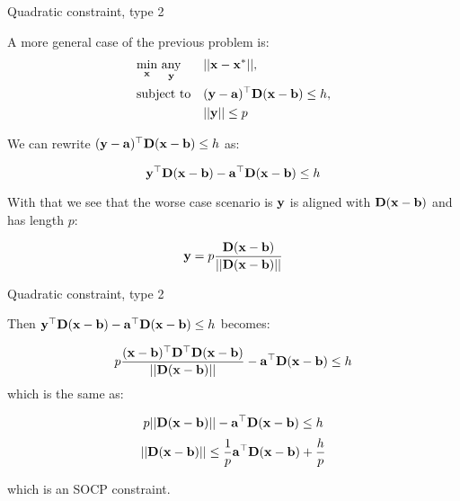 \documentclass{beamer}
\begin{document}
\begin{frame}{Quadratic constraint, type 2}
\begin{flushleft}

A more general case of the previous problem is:
%
\begin{equation}
\begin{aligned}
& \underset{\mathbf{x}}{\text{min}} \ \underset{\mathbf{y}}{\text{any}}
& & ||\mathbf{x} - \mathbf{x}^*||, \\
& \text{subject to}
& & (\mathbf{y} - \mathbf{a})^\top \mathbf{D} (\mathbf{x} - \mathbf{b}) \leq h, \\
& & & ||\mathbf{y}|| \leq p
\end{aligned}
\end{equation}
%

We can rewrite $(\mathbf{y} - \mathbf{a})^\top \mathbf{D} (\mathbf{x} - \mathbf{b}) \leq h$ as:

\begin{equation}
    \mathbf{y}^\top \mathbf{D} (\mathbf{x} - \mathbf{b}) - \mathbf{a}^\top \mathbf{D} (\mathbf{x} - \mathbf{b}) \leq h
\end{equation}

With that we see that the worse case scenario is $\mathbf{y}$ is aligned with $\mathbf{D} (\mathbf{x} - \mathbf{b})$ and has length $p$:

\begin{equation}
    \mathbf{y} = p \frac{\mathbf{D} (\mathbf{x} - \mathbf{b})}{|| \mathbf{D} (\mathbf{x} - \mathbf{b}) ||}
\end{equation}

 
\end{flushleft}
\end{frame}




\begin{frame}{Quadratic constraint, type 2}
\begin{flushleft}

Then $\mathbf{y}^\top \mathbf{D} (\mathbf{x} - \mathbf{b}) - \mathbf{a}^\top \mathbf{D} (\mathbf{x} - \mathbf{b}) \leq h$ becomes:

\begin{equation}
    p \frac{ (\mathbf{x} - \mathbf{b})^\top \mathbf{D}^\top \mathbf{D} (\mathbf{x} - \mathbf{b}) }{|| \mathbf{D} (\mathbf{x} - \mathbf{b}) ||}  - \mathbf{a}^\top \mathbf{D} (\mathbf{x} - \mathbf{b}) \leq h
\end{equation}
%
which is the same as:

\begin{equation}
    p || \mathbf{D} (\mathbf{x} - \mathbf{b}) || - \mathbf{a}^\top \mathbf{D} (\mathbf{x} - \mathbf{b}) \leq h
\end{equation}
\begin{equation}
    || \mathbf{D} (\mathbf{x} - \mathbf{b}) ||  \leq \frac{1}{p}\mathbf{a}^\top \mathbf{D} (\mathbf{x} - \mathbf{b}) + \frac{h}{p}
\end{equation}

which is an SOCP constraint.
 
\end{flushleft}
\end{frame}
\end{document}
